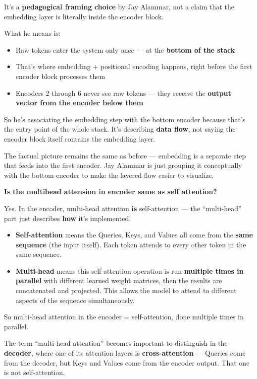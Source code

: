 It's a \textbf{pedagogical framing choice} by Jay Alammar, not a claim that the embedding layer is literally inside the encoder block.

What he means is:
\begin{itemize}
  \item Raw tokens enter the system only once --- at the \textbf{bottom of the stack}
  \item That's where embedding + positional encoding happens, right before the first encoder block processes them
  \item Encoders 2 through 6 never see raw tokens --- they receive the \textbf{output vector from the encoder below them}
\end{itemize}

So he's associating the embedding step with the bottom encoder because that's the entry point of the whole stack. It's describing \textbf{data flow}, not saying the encoder block itself contains the embedding layer.

The factual picture remains the same as before --- embedding is a separate step that feeds into the first encoder. Jay Alammar is just grouping it conceptually with the bottom encoder to make the layered flow easier to visualize.

\medskip

\textbf{Is the multihead attension in encoder same as self attention?}

Yes. In the encoder, multi-head attention \textbf{is} self-attention --- the ``multi-head'' part just describes \textbf{how} it's implemented.

\begin{itemize}
  \item \textbf{Self-attention} means the Queries, Keys, and Values all come from the \textbf{same sequence} (the input itself). Each token attends to every other token in the same sequence.
  \item \textbf{Multi-head} means this self-attention operation is run \textbf{multiple times in parallel} with different learned weight matrices, then the results are concatenated and projected. This allows the model to attend to different aspects of the sequence simultaneously.
\end{itemize}

So multi-head attention in the encoder = self-attention, done multiple times in parallel.

The term ``multi-head attention'' becomes important to distinguish in the \textbf{decoder}, where one of its attention layers is \textbf{cross-attention} --- Queries come from the decoder, but Keys and Values come from the encoder output. That one is not self-attention.
